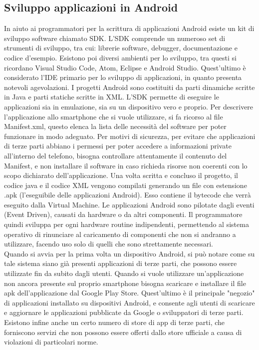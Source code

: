 \subsection{Sviluppo applicazioni in Android}
In aiuto ai programmatori per la scrittura di applicazioni Android esiste un
kit di sviluppo software  chiamato SDK. L’SDK  comprende un numeroso set di
strumenti di sviluppo, tra cui: librerie software, debugger, documentazione e
codice d’esempio. Esistono poi diversi ambienti per lo sviluppo, tra questi si
ricordano Visual Studio Code, Atom, Eclipse e Android Studio. Quest'ultimo è considerato l'IDE
primario per lo sviluppo di applicazioni, in quanto presenta notevoli agevolazioni.
I progetti Android sono costituiti da parti dinamiche scritte in Java e
parti statiche scritte in XML. L’SDK permette  di eseguire le applicazioni sia
in emulazione, sia su un dispositivo vero e proprio. Per descrivere
l’applicazione allo smartphone che si vuole utilizzare, si fa ricorso al file
Manifest.xml, questo elenca la lista delle necessità del software per poter
funzionare in modo adeguato. Per motivi di sicurezza, per evitare che
applicazioni di terze parti abbiano i permessi per poter accedere a informazioni
private all’interno del
telefono, bisogna controllare attentamente il contenuto del Manifest, e non
installare il software in caso richieda risorse non coerenti con lo scopo
dichiarato dell’applicazione. Una volta scritta e concluso il progetto, il
codice java e il codice XML vengono compilati generando un file con estensione
.apk (l’eseguibile delle applicazioni Android). Esso contiene il bytecode che verrà
eseguito dalla Virtual Machine. Le applicazioni Android sono pilotate
dagli eventi (Event Driven), causati da hardware o da altri
componenti. Il programmatore quindi sviluppa per ogni hardware routine
indipendenti, permettendo al sistema operativo di rinunciare al caricamento di
componenti che non si andranno a utilizzare, facendo uso solo di quelli che sono
strettamente necessari. \\
Quando si avvia per la prima volta un dispositivo Android, si può notare come su
tale sistema siano già presenti
applicazioni di terze parti, che possono essere utilizzate fin da subito
dagli utenti. Quando si vuole utilizzare un'applicazione non ancora presente sul
proprio smartphone bisogna scaricare e installare il file apk dell’applicazione
dal Google Play Store. Quest’ultimo è il principale "negozio" di
applicazioni installato su dispositivi Android, e consente agli utenti di
scaricare e aggiornare le applicazioni pubblicate da Google o sviluppatori di
terze parti. Esistono infine anche un certo numero di store di app di terze
parti, che forniscono servizi che non possono essere offerti dallo store
ufficiale a causa di violazioni di particolari norme.

